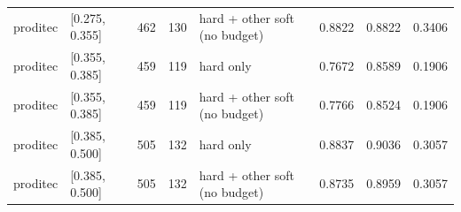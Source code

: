 \begin{tabular}{llrrlrrr}
proditec & [0.275, 0.355] &      462 &     130 & hard + other soft (no budget) &          0.8822 &    0.8822 & 0.3406 \\
proditec & [0.355, 0.385] &      459 &     119 &                     hard only &          0.7672 &    0.8589 & 0.1906 \\
proditec & [0.355, 0.385] &      459 &     119 & hard + other soft (no budget) &          0.7766 &    0.8524 & 0.1906 \\
proditec & [0.385, 0.500] &      505 &     132 &                     hard only &          0.8837 &    0.9036 & 0.3057 \\
proditec & [0.385, 0.500] &      505 &     132 & hard + other soft (no budget) &          0.8735 &    0.8959 & 0.3057 \\
\bottomrule
\end{tabular}
